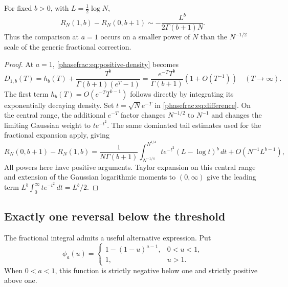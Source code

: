 \begin{proposition}
\label{phasefrac:prop:critical}
For fixed $b>0$, with $L=\tfrac12\log N$,
\[
 R_N(1,b)-R_N(0,b+1)
 \sim-\frac{L^b}{2\Gamma(b+1)N}.
\]
Thus the comparison at $a=1$ occurs on a smaller power of $N$ than
the $N^{-1/2}$ scale of the generic fractional correction.
\end{proposition}
\begin{proof}
At $a=1$, \eqref{phasefrac:eq:positive-density} becomes
\[
 D_{1,b}(T)=h_b(T)+\frac{T^b}{\Gamma(b+1)(e^T-1)}
 =\frac{e^{-T}T^b}{\Gamma(b+1)}
        \left(1+O(T^{-1})\right)
 \quad(T\to\infty).
\]
The first term $h_b(T)=O(e^{-T}T^{b-1})$ follows directly by
integrating its exponentially decaying density. Set
$t=\sqrt N e^{-T}$ in \eqref{phasefrac:eq:difference}. On the
central range, the additional $e^{-T}$ factor changes $N^{-1/2}$
to $N^{-1}$ and changes the limiting Gaussian weight to $t e^{-t^2}$.
The same dominated tail estimates used for the fractional expansion
apply, giving
\[
 R_N(0,b+1)-R_N(1,b)
 =\frac1{N\Gamma(b+1)}
   \int_{N^{-1/4}}^{N^{1/4}} t e^{-t^2}(L-\log t)^b\,dt
   +O(N^{-1}L^{b-1}),
\]
All powers here have positive arguments. Taylor expansion on this
central range and extension of the Gaussian logarithmic moments to
$(0,\infty)$ give the leading term
$L^b\int_0^\infty t e^{-t^2}\,dt=L^b/2$.
\end{proof}

\subsection{Exactly one reversal below the threshold}

The fractional integral admits a useful alternative expression. Put
\[
 \phi_a(u)=
 \begin{cases}
 1-(1-u)^{a-1},&0<u<1,\\
 1,&u>1.
 \end{cases}
\]
When $0<a<1$, this function is strictly negative below one and strictly
positive above one.

